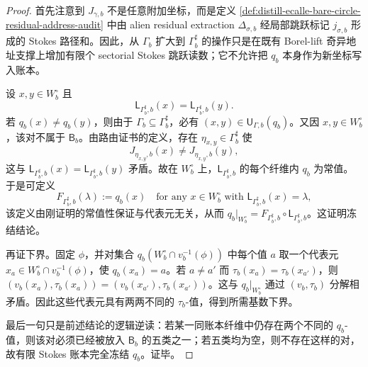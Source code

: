 \begin{proof}
首先注意到 \(J_{\gamma,b}\) 不是任意附加坐标，而是定义 \ref{def:distill-ecalle-bare-circle-residual-address-audit} 中由 alien residual extraction
\(\Delta_{\sigma,b}\) 经局部跳跃标记 \(j_{\sigma,b}\) 形成的 Stokes 路径和。因此，从 \(\Gamma_b\) 扩大到 \(\Gamma_b^{\sharp}\) 的操作只是在既有 Borel-lift 奇异地址支撑上增加有限个 sectorial Stokes 跳跃读数；它不允许把 \(q_b\) 本身作为新坐标写入账本。

设 \(x,y\in W_b^{\circ}\) 且
\[
\mathsf L_{\Gamma_b^{\sharp},b}(x)=\mathsf L_{\Gamma_b^{\sharp},b}(y).
\]
若 \(q_b(x)\ne q_b(y)\)，则由于 \(\Gamma_b\subseteq\Gamma_b^{\sharp}\)，必有
\((x,y)\in\mathsf U_{\Gamma,b}(q_b)\)。又因 \(x,y\in W_b^{\circ}\)，该对不属于 \(\mathsf B_b\)。由路由证书的定义，存在
\(\eta_{x,y}\in\Gamma_b^{\sharp}\) 使
\[
J_{\eta_{x,y},b}(x)\ne J_{\eta_{x,y},b}(y),
\]
这与
\(\mathsf L_{\Gamma_b^{\sharp},b}(x)=\mathsf L_{\Gamma_b^{\sharp},b}(y)\)
矛盾。故在 \(W_b^{\circ}\) 上，\(\mathsf L_{\Gamma_b^{\sharp},b}\) 的每个纤维内 \(q_b\) 为常值。于是可定义
\[
F_{\Gamma_b^{\sharp},b}(\lambda):=q_b(x)
\quad
\text{for any }x\in W_b^{\circ}\text{ with }\mathsf L_{\Gamma_b^{\sharp},b}(x)=\lambda,
\]
该定义由刚证明的常值性保证与代表元无关，从而
\(q_b|_{W_b^{\circ}}=F_{\Gamma_b^{\sharp},b}\circ\mathsf L_{\Gamma_b^{\sharp},b}\)。这证明冻结结论。

再证下界。固定 \(\phi\)，并对集合
\(q_b(W_b^{\circ}\cap v_b^{-1}(\phi))\) 中每个值 \(a\) 取一个代表元
\(x_a\in W_b^{\circ}\cap v_b^{-1}(\phi)\)，使 \(q_b(x_a)=a\)。若 \(a\ne a'\) 而
\(\tau_b(x_a)=\tau_b(x_{a'})\)，则
\((v_b(x_a),\tau_b(x_a))=(v_b(x_{a'}),\tau_b(x_{a'}))\)。这与 \(q_b|_{W_b^{\circ}}\) 通过 \((v_b,\tau_b)\) 分解相矛盾。因此这些代表元具有两两不同的 \(\tau_b\)-值，得到所需基数下界。

最后一句只是前述结论的逻辑逆读：若某一同账本纤维中仍存在两个不同的 \(q_b\)-值，则该对必须已经被放入 \(\mathsf B_b\) 的五类之一；若五类均为空，则不存在这样的对，故有限 Stokes 账本完全冻结 \(q_b\)。证毕。
\end{proof}

